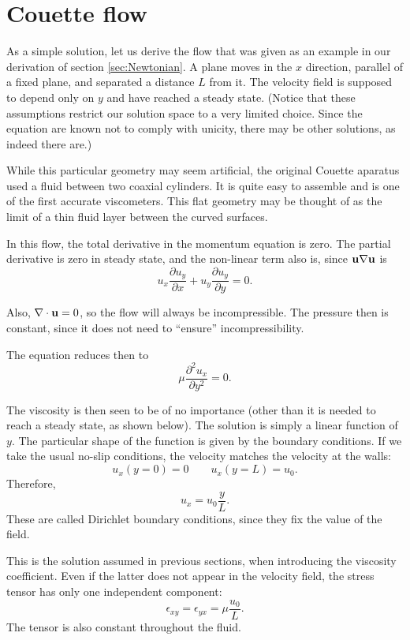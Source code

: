 \section{Couette flow}
\label{sec:Couette}

As a simple solution, let us derive the flow that was given as an
example in our derivation of section \ref{sec:Newtonian}. A plane moves in the
$x$ direction, parallel of a fixed plane, and separated a distance $L$
from it. The velocity field is supposed to depend only on $y$ and have
reached a steady state. (Notice that these assumptions restrict our
solution space to a very limited choice. Since the equation are known
not to comply with unicity, there may be other solutions, as indeed
there are.)

While this particular geometry may seem artificial, the original
Couette aparatus used a fluid between two coaxial cylinders. It is
quite easy to assemble and is one of the first accurate
viscometers. This flat geometry may be thought of as the limit of a
thin fluid layer between the curved surfaces.

In this flow, the total derivative in the momentum equation is
zero. The partial derivative is zero in steady state, and the
non-linear term also is, since $\mathbf{u}\nabla \mathbf{u}$ is
\[
u_x \frac{\partial u_y}{\partial x} +
u_y \frac{\partial u_y}{\partial y} = 0 .
\]

Also, $\nabla\cdot\mathbf{u}=0$, so the flow will always be
incompressible. The pressure then is constant, since it does not need
to ``ensure'' incompressibility.

The equation reduces then to
\[
\mu \frac{\partial^2 u_x}{\partial y^2} = 0 .
\]

The viscosity is then seen to be of no importance (other than it is
needed to reach a steady state, as shown below). The solution is
simply a linear function of $y$. The particular shape of the function
is given by the boundary conditions. If we take the usual no-slip
conditions, the velocity matches the velocity at the walls:
\[
u_x(y=0) =  0 \qquad u_x(y=L) = u_0 .
\]
Therefore,
\[
u_x =   u_0 \frac{y}{L} .
\]
These are called Dirichlet boundary conditions, since they fix the
value of the field.

This is the solution assumed in previous sections, when introducing
the viscosity coefficient. Even if the latter does not appear in the
velocity field, the stress tensor has only one independent component:
\[
\epsilon_{xy}=
\epsilon_{yx}=
\mu \frac{u_0}{L} .
\]
The tensor is also constant throughout the fluid.

